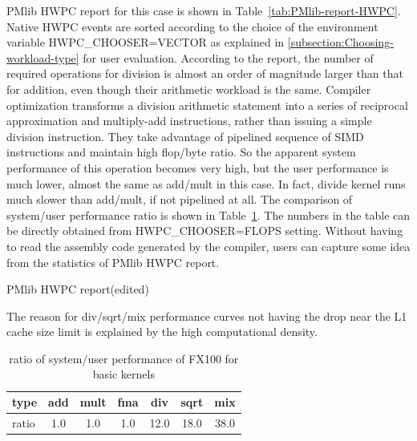 \documentclass[conference]{IEEEtran}
\begin{document}
PMlib HWPC report for this case is shown in Table~\ref{tab:PMlib-report-HWPC}.
Native HWPC events are sorted according to the choice of the
environment variable HWPC\_CHOOSER=VECTOR as explained in
\ref{subsection:Choosing-workload-type} for user evaluation.
According to the report,
the number of required operations for division is almost an order of magnitude
larger than that for addition, even though their arithmetic workload
is the same.
Compiler optimization transforms
a division arithmetic statement into a series of reciprocal
approximation and multiply-add instructions, rather than issuing
a simple division instruction. They take advantage of pipelined sequence of
SIMD instructions and maintain high flop/byte ratio.
So the apparent system performance of this operation becomes very high,
but the user performance is much lower, almost the same as
add/mult in this case. In fact, divide kernel runs much slower than add/mult,
if not pipelined at all.
The comparison of system/user performance ratio is shown in
Table~\ref{tab:ratio-system-user-fx100}. The numbers in the table can be
directly obtained from HWPC\_CHOOSER=FLOPS setting.
Without having to read the assembly code generated by the compiler,
users can capture some idea from the statistics of PMlib HWPC report.
\begin{table}[tb]
\centering
\caption{PMlib HWPC report(edited)}
\label{tab:PMlib-report-HWPC}
\footnotesize

\end{table}

The reason for div/sqrt/mix performance curves not having the drop near
the L1 cache size limit is explained by the high computational density.
\begin{table}[tb]
\centering
\caption{ratio of system/user performance of FX100 for basic kernels}
\label{tab:ratio-system-user-fx100}
\begin{tabular}{l|c|c|c|c|c|c} \hline
type &	add	&	mult &	fma &	div &	sqrt &	mix \\ \hline
ratio &	1.0 &	1.0 &	1.0 &	12.0 &	18.0 &	38.0 \\ \hline 	
\end{tabular}
\end{table}
\end{document}
